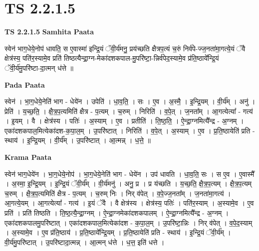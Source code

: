 \documentclass[17pt]{extarticle}
\begin{document}
\section{ TS 2.2.1.5 }

\textbf{TS 2.2.1.5 } \newline
\textbf{Samhita Paata} \newline

स्वेन॑ भाग॒धेये॒नोप॑ धावति॒ स ए॒वास्मा॑ इन्द्रि॒यं ॅवी॒र्य॑मनु॒ प्रय॑च्छति क्षैत्रप॒त्यं च॒रुं निर्व॑पे-ज्ज॒नता॑मा॒गत्ये॒यं ॅवै क्षेत्र॑स्य॒ पति॑र॒स्यामे॒व प्रति॑ तिष्ठत्यैन्द्रा॒ग्न-मेका॑दशकपाल-मु॒परि॑ष्टा॒-न्निर्व॑पेद॒स्यामे॒व प्र॑ति॒ष्ठाये᳚न्द्रि॒यं ॅवी॒र्य॑मु॒परि॑ष्टा-दा॒त्मन् ध॑त्ते ॥ \newline

\textbf{Pada Paata} \newline

स्वेन॑ । भा॒ग॒धेये॒नेति॑ भाग - धेये॑न । उपेति॑ । धा॒व॒ति॒ । सः । ए॒व । अ॒स्मै॒ । इ॒न्द्रि॒यम् । वी॒र्य᳚म् । अनु॑ । प्रेति॑ । य॒च्छ॒ति॒ । क्षै॒त्र॒प॒त्यमिति॑ क्षैत्र - प॒त्यम् । च॒रुम् । निरिति॑ । व॒पे॒त् । ज॒नता᳚म् । आ॒गत्येत्या᳚ - गत्य॑ । इ॒यम् । वै । क्षेत्र॑स्य । पतिः॑ । अ॒स्याम् । ए॒व । प्रतीति॑ । ति॒ष्ठ॒ति॒ । ऐ॒न्द्रा॒ग्नमित्यै᳚न्द्र - अ॒ग्नम् । एका॑दशकपाल॒मित्येका॑दश-क॒पा॒ल॒म् । उ॒परि॑ष्टात् । निरिति॑ । व॒पे॒त् । अ॒स्याम् । ए॒व । प्र॒ति॒ष्ठायेति॑ प्रति - स्थाय॑ । इ॒न्द्रि॒यम् । वी॒र्य᳚म् । उ॒परि॑ष्टात् । आ॒त्मन्न् । ध॒त्ते॒ ॥  \newline


\textbf{Krama Paata} \newline

स्वेन॑ भाग॒धेये॑न । भा॒ग॒धेये॒नोप॑ । भा॒ग॒धेये॒नेति॑ भाग - धेये॑न । उप॑ धावति । धा॒व॒ति॒ सः । स ए॒व । ए॒वास्मै᳚ । अ॒स्मा॒ इ॒न्द्रि॒यम् । इ॒न्द्रि॒यं ॅवी॒र्य᳚म् । वी॒र्य॑मनु॑ । अनु॒ प्र । प्र य॑च्छति । य॒च्छ॒ति॒ क्षै॒त्र॒प॒त्यम् । क्षै॒त्र॒प॒त्यम् च॒रुम् । क्षै॒त्र॒प॒त्यमिति॑ क्षैत्र - प॒त्यम् । च॒रुम् निः । निर् व॑पेत् । व॒पे॒ज्ज॒नता᳚म् । ज॒नता॑मा॒गत्य॑ । आ॒गत्ये॒यम् । आ॒गत्येत्या᳚ - गत्य॑ । इ॒यं ॅवै । वै क्षेत्र॑स्य । क्षेत्र॑स्य॒ पतिः॑ । पति॑र॒स्याम् । अ॒स्यामे॒व । ए॒व प्रति॑ । प्रति॑ तिष्ठति । ति॒ष्ठ॒त्यै॒न्द्रा॒ग्नम् । ऐ॒न्द्रा॒ग्नमेका॑दशकपालम् । ऐ॒न्द्रा॒ग्नमित्यै᳚न्द्र - अ॒ग्नम् । एका॑दशकपालमु॒परि॑ष्टात् । एका॑दशकपाल॒मित्येका॑दश - क॒पा॒ल॒म् । उ॒परि॑ष्टा॒न्निः । निर् व॑पेत् । व॒पे॒द॒स्याम् । अ॒स्यामे॒व । ए॒व प्र॑ति॒ष्ठाय॑ । प्र॒ति॒ष्ठाये᳚न्द्रि॒यम् । प्र॒ति॒ष्ठायेति॑ प्रति - स्थाय॑ । इ॒न्द्रि॒यं ॅवी॒र्य᳚म् । वी॒र्य॑मु॒परि॑ष्टात् । उ॒परि॑ष्टादा॒त्मन्न् । आ॒त्मन् ध॑त्ते । ध॒त्त॒ इति॑ धत्ते । \newline
\end{document}
